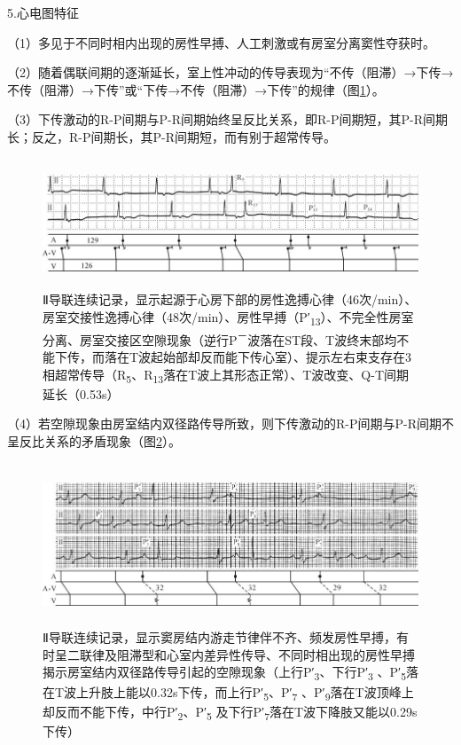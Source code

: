 5.心电图特征

（1）多见于不同时相内出现的房性早搏、人工刺激或有房室分离窦性夺获时。

（2）随着偶联间期的逐渐延长，室上性冲动的传导表现为“不传（阻滞）→下传→不传（阻滞）→下传”或“下传→不传（阻滞）→下传”的规律（图\ref{fig28-10}）。

（3）下传激动的R-P间期与P-R间期始终呈反比关系，即R-P间期短，其P-R间期长；反之，R-P间期长，其P-R间期短，而有别于超常传导。

\begin{figure}[!htbp]
 \centering
 \includegraphics[width=5.86458in,height=1.51042in]{./images/Image00471.jpg}
 \captionsetup{justification=centering}
 \caption{Ⅱ导联连续记录，显示起源于心房下部的房性逸搏心律（46次/min）、房室交接性逸搏心律（48次/min）、房性早搏（P′\textsubscript{13}）、不完全性房室分离、房室交接区空隙现象（逆行P\textsuperscript{－}波落在ST段、T波终末部均不能下传，而落在T波起始部却反而能下传心室）、提示左右束支存在3相超常传导（R\textsubscript{5}、R\textsubscript{13}落在T波上其形态正常）、T波改变、Q-T间期延长（0.53s）}
 \label{fig28-10}
  \end{figure} 


（4）若空隙现象由房室结内双径路传导所致，则下传激动的R-P间期与P-R间期不呈反比关系的矛盾现象（图\ref{fig28-11}）。

\begin{figure}[!htbp]
 \centering
 \includegraphics[width=5.80208in,height=1.90625in]{./images/Image00472.jpg}
 \captionsetup{justification=centering}
 \caption{Ⅱ导联连续记录，显示窦房结内游走节律伴不齐、频发房性早搏，有时呈二联律及阻滞型和心室内差异性传导、不同时相出现的房性早搏揭示房室结内双径路传导引起的空隙现象（上行P′\textsubscript{3}、下行P′\textsubscript{3} 、P′\textsubscript{5}落在T波上升肢上能以0.32s下传，而上行P′\textsubscript{5}、P′\textsubscript{7} 、P′\textsubscript{9}落在T波顶峰上却反而不能下传，中行P′\textsubscript{2}、P′\textsubscript{5} 及下行P′\textsubscript{7}落在T波下降肢又能以0.29s下传）}
 \label{fig28-11}
  \end{figure} 


